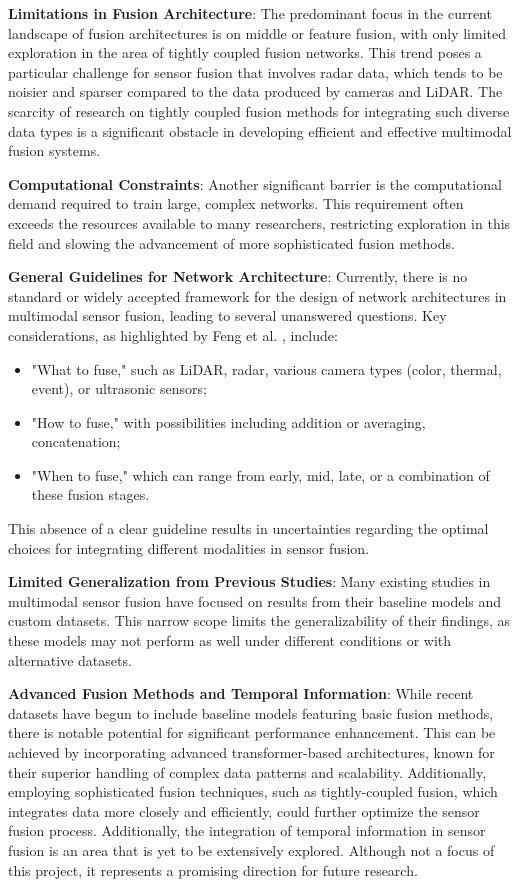 \documentclass[report.tex]{subfiles}
\begin{document}
        \textbf{Limitations in Fusion Architecture}: The predominant focus in the current landscape of fusion architectures is on middle or feature fusion, with only limited exploration in the area of tightly coupled fusion networks. This trend poses a particular challenge for sensor fusion that involves radar data, which tends to be noisier and sparser compared to the data produced by cameras and LiDAR. The scarcity of research on tightly coupled fusion methods for integrating such diverse data types is a significant obstacle in developing efficient and effective multimodal fusion systems.

        \textbf{Computational Constraints}: Another significant barrier is the computational demand required to train large, complex networks. This requirement often exceeds the resources available to many researchers, restricting exploration in this field and slowing the advancement of more sophisticated fusion methods.

        \textbf{General Guidelines for Network Architecture}: Currently, there is no standard or widely accepted framework for the design of network architectures in multimodal sensor fusion, leading to several unanswered questions. Key considerations, as highlighted by Feng et al. \cite{feng2020deep}, include:
        \begin{itemize}
            \item "What to fuse," such as LiDAR, radar, various camera types (color, thermal, event), or ultrasonic sensors;
            \item "How to fuse," with possibilities including addition or averaging, concatenation;
            \item "When to fuse," which can range from early, mid, late, or a combination of these fusion stages.
        \end{itemize}
        This absence of a clear guideline results in uncertainties regarding the optimal choices for integrating different modalities in sensor fusion.

        \textbf{Limited Generalization from Previous Studies}: Many existing studies in multimodal sensor fusion have focused on results from their baseline models and custom datasets. This narrow scope limits the generalizability of their findings, as these models may not perform as well under different conditions or with alternative datasets.

        \textbf{Advanced Fusion Methods and Temporal Information}: While recent datasets have begun to include baseline models featuring basic fusion methods, there is notable potential for significant performance enhancement. This can be achieved by incorporating advanced transformer-based architectures, known for their superior handling of complex data patterns and scalability. Additionally, employing sophisticated fusion techniques, such as tightly-coupled fusion, which integrates data more closely and efficiently, could further optimize the sensor fusion process. Additionally, the integration of temporal information in sensor fusion is an area that is yet to be extensively explored. Although not a focus of this project, it represents a promising direction for future research.
\end{document}
